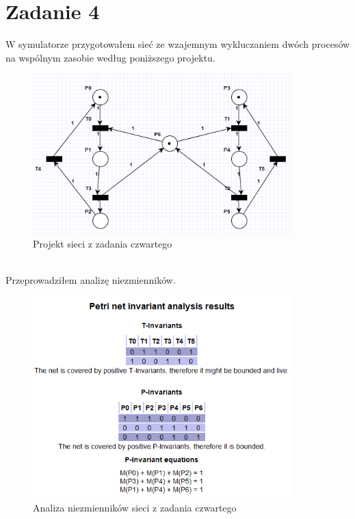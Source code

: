 \documentclass{article}
\begin{document}
    \section{Zadanie 4}
        W symulatorze przygotowałem sieć ze wzajemnym wykluczaniem dwóch procesów na wspólnym zasobie według poniższego projektu.
        \begin{figure}[h!]
            \centering
            \includegraphics[width=10cm]{lab6/n4.png}
            \caption{Projekt sieci z zadania czwartego}
        \end{figure}\\
        \FloatBarrier
        Przeprowadziłem analizę niezmienników. 
        \begin{figure}[h!]
            \centering
            \includegraphics[width=10cm]{lab6/n4_1.png}
            \caption{Analiza niezmienników sieci z zadania czwartego}
        \end{figure}\\

    \newpage
\end{document}
